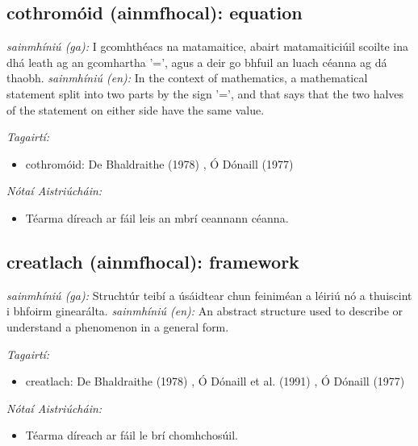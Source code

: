 \documentclass{article}
\begin{document}
\subsection*{cothromóid (ainmfhocal): equation} 
 \noindent \textit{sainmhíniú (ga):} I gcomhthéacs na matamaitice, abairt matamaiticiúil scoilte ina dhá leath ag an gcomhartha '=', agus a deir go bhfuil an luach céanna ag dá thaobh.
\newline\newline
 \noindent \textit{sainmhíniú (en):} In the context of mathematics, a mathematical statement split into two parts by the sign '=', and that says that the two halves of the statement on either side have the same value.
\newline

 \noindent \textit{Tagairtí:}
\begin{itemize}
	\item cothromóid: De Bhaldraithe (1978) \cite{de-bhaldraithe}, Ó Dónaill (1977) \cite{odonaill}
\end{itemize}

 \noindent \textit{Nótaí Aistriúcháin:}
\begin{itemize}
	\item Téarma díreach ar fáil leis an mbrí ceannann céanna.
\end{itemize}


\subsection*{creatlach (ainmfhocal): framework} 
 \noindent \textit{sainmhíniú (ga):} Struchtúr teibí a úsáidtear chun feiniméan a léiriú nó a thuiscint i bhfoirm ginearálta.
\newline\newline
 \noindent \textit{sainmhíniú (en):} An abstract structure used to describe or understand a phenomenon in a general form.
\newline

 \noindent \textit{Tagairtí:}
\begin{itemize}
	\item creatlach: De Bhaldraithe (1978) \cite{de-bhaldraithe}, Ó Dónaill et al. (1991) \cite{focloir-beag}, Ó Dónaill (1977) \cite{odonaill}
\end{itemize}

 \noindent \textit{Nótaí Aistriúcháin:}
\begin{itemize}
	\item Téarma díreach ar fáil le brí chomhchosúil.
\end{itemize}
\end{document}
